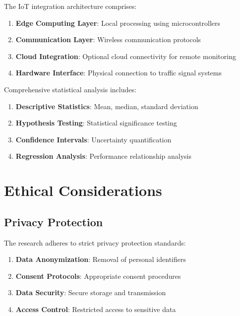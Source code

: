 The IoT integration architecture comprises:

\begin{enumerate}
    \item \textbf{Edge Computing Layer}: Local processing using microcontrollers
    \item \textbf{Communication Layer}: Wireless communication protocols
    \item \textbf{Cloud Integration}: Optional cloud connectivity for remote monitoring
    \item \textbf{Hardware Interface}: Physical connection to traffic signal systems
\end{enumerate}



Comprehensive statistical analysis includes:

\begin{enumerate}
    \item \textbf{Descriptive Statistics}: Mean, median, standard deviation
    \item \textbf{Hypothesis Testing}: Statistical significance testing
    \item \textbf{Confidence Intervals}: Uncertainty quantification
    \item \textbf{Regression Analysis}: Performance relationship analysis
\end{enumerate}

\section{Ethical Considerations}

\subsection{Privacy Protection}

The research adheres to strict privacy protection standards:

\begin{enumerate}
    \item \textbf{Data Anonymization}: Removal of personal identifiers
    \item \textbf{Consent Protocols}: Appropriate consent procedures
    \item \textbf{Data Security}: Secure storage and transmission
    \item \textbf{Access Control}: Restricted access to sensitive data
\end{enumerate}

